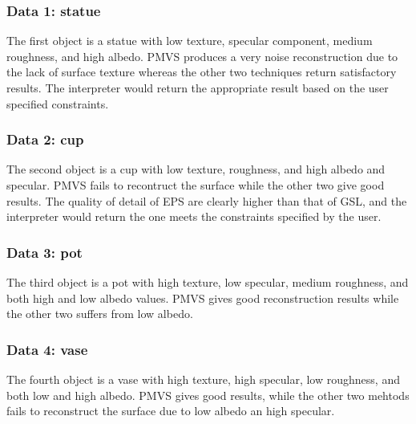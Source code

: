\subsubsection{Data 1: statue}
The first object is a statue with low texture, specular component, medium roughness, and high albedo. PMVS produces a very noise reconstruction due to the lack of surface texture whereas the other two techniques return satisfactory results. The interpreter would return the appropriate result based on the user specified constraints.

\subsubsection{Data 2: cup}
The second object is a cup with low texture, roughness, and high albedo and specular. PMVS fails to recontruct the surface while the other two give good results. The quality of detail of EPS are clearly higher than that of GSL, and the interpreter would return the one meets the constraints specified by the user.

\subsubsection{Data 3: pot}
The third object is a pot with high texture, low specular, medium roughness, and both high and low albedo values. PMVS gives good reconstruction results while the other two suffers from low albedo.

\subsubsection{Data 4: vase}
The fourth object is a vase with high texture, high specular, low roughness, and both low and high albedo. PMVS gives good results, while the other two mehtods fails to reconstruct the surface due to low albedo an high specular.

